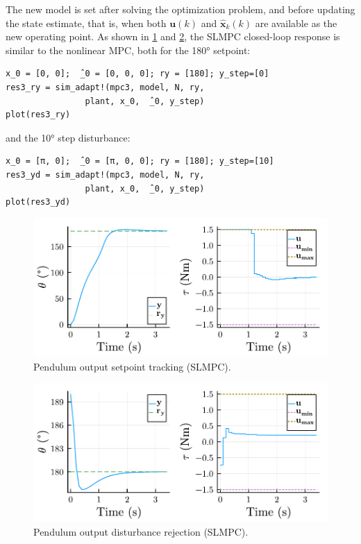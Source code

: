 The new model is set after solving the optimization problem, and before updating the state estimate, that is, when both $\mathbf{u}(k)$ and $\mathbf{\hat{x}}_k(k)$ are available as the new operating point. As shown in \cref{fig:plot_SuccLinMPC1} and \ref{fig:plot_SuccLinMPC2}, the SLMPC closed-loop response is similar to the nonlinear MPC, both for the 180° setpoint:
\begin{verbatim}
x_0 = [0, 0];  ̂_0 = [0, 0, 0]; ry = [180]; y_step=[0]
res3_ry = sim_adapt!(mpc3, model, N, ry, 
                plant, x_0,  ̂_0, y_step)
plot(res3_ry)
\end{verbatim}
and the 10° step disturbance:
\begin{verbatim}
x_0 = [π, 0];  ̂_0 = [π, 0, 0]; ry = [180]; y_step=[10]
res3_yd = sim_adapt!(mpc3, model, N, ry, 
                plant, x_0,  ̂_0, y_step)
plot(res3_yd)
\end{verbatim}

\begin{figure}[ht]
    \centering
    \includegraphics[width=\columnwidth]{fig/plot_SuccLinMPC1.pdf}
    \caption{Pendulum output setpoint tracking (SLMPC).}\label{fig:plot_SuccLinMPC1}
\end{figure}

\begin{figure}[ht]
    \centering
    \includegraphics[width=\columnwidth]{fig/plot_SuccLinMPC2.pdf}
    \caption{Pendulum output disturbance rejection (SLMPC).}\label{fig:plot_SuccLinMPC2}
\end{figure}

